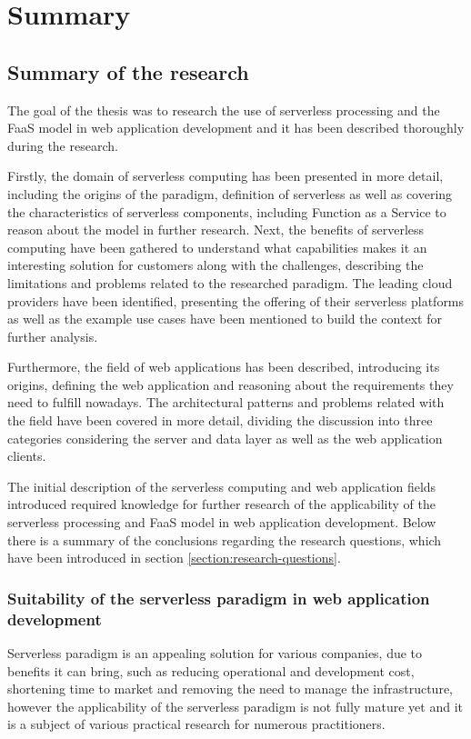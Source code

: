\chapter{Summary}

\section{Summary of the research}

The goal of the thesis was to research the use of serverless processing and the FaaS model in web application development and it has been described thoroughly during the research.

Firstly, the domain of serverless computing has been presented in more detail, including the origins of the paradigm, definition of serverless as well as covering the characteristics of serverless components, including Function as a Service to reason about the model in further research.
Next, the benefits of serverless computing have been gathered to understand what capabilities makes it an interesting solution for customers along with the challenges, describing the limitations and problems related to the researched paradigm.
The leading cloud providers have been identified, presenting the offering of their serverless platforms as well as the example use cases have been mentioned to build the context for further analysis.

Furthermore, the field of web applications has been described, introducing its origins, defining the web application and reasoning about the requirements they need to fulfill nowadays.
The architectural patterns and problems related with the field have been covered in more detail, dividing the discussion into three categories considering the server and data layer as well as the web application clients.

The initial description of the serverless computing and web application fields introduced required knowledge for further research of the applicability of the serverless processing and FaaS model in web application development.
Below there is a summary of the conclusions regarding the research questions, which have been introduced in section \ref{section:research-questions}.

\subsection{Suitability of the serverless paradigm in web application development}

Serverless paradigm is an appealing solution for various companies, due to benefits it can bring, such as reducing operational and development cost, shortening time to market and removing the need to manage the infrastructure, however the applicability of the serverless paradigm is not fully mature yet and it is a subject of various practical research for numerous practitioners.

